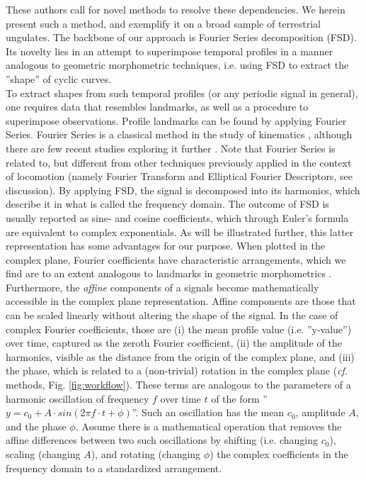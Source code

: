 These authors call for novel methods to resolve these dependencies.
We herein present such a method, and exemplify it on a broad sample of terrestrial ungulates.
The backbone of our approach is Fourier Series decomposition (FSD).
Its novelty lies in an attempt to superimpose temporal profiles in a manner analogous to geometric morphometric techniques, i.e. using FSD to extract the ''shape'' of cyclic curves.
\\To extract shapes from such temporal profiles (or any periodic signal in general), one requires data that resembles landmarks, as well as a procedure to superimpose observations.
Profile landmarks can be found by applying Fourier Series.
Fourier Series is a classical method in the study of kinematics \citep{Bernstein1927a,Bernstein1935}, although there are few recent studies exploring it further \citep{vanWeeren1992,Grasso2000,Webb2007}.
Note that Fourier Series is related to, but different from other techniques previously applied in the context of locomotion (namely Fourier Transform and Elliptical Fourier Descriptors, see discussion).
By applying FSD, the signal is decomposed into its harmonics, which describe it in what is called the frequency domain.
The outcome of FSD is usually reported as sine- and cosine coefficients, which through Euler's formula are equivalent to complex exponentials.
As will be illustrated further, this latter representation has some advantages for our purpose.
When plotted in the complex plane, Fourier coefficients have characteristic arrangements, which we find are to an extent analogous to landmarks in geometric morphometrics \citep{Bookstein1991,Kendall1989}.
Furthermore, the \textit{affine} components of a signals become mathematically accessible in the complex plane representation.
Affine components are those that can be scaled linearly without altering the shape of the signal.
In the case of complex Fourier coefficients, those are (i) the mean profile value (i.e. ''y-value'') over time, captured as the zeroth Fourier coefficient, (ii) the amplitude of the harmonics, visible as the distance from the origin of the complex plane, and (iii) the phase, which is related to a (non-trivial) rotation in the complex plane (\textit{cf.} methods, Fig. \ref{fig:workflow}).
These terms are analogous to the parameters of a harmonic oscillation of frequency $f$ over time $t$ of the form ''$y = c_0 + A\cdot sin(2\pi f\cdot t + \phi)$''.
Such an oscillation has the mean $c_0$, amplitude $A$, and the phase $\phi$.
Assume there is a mathematical operation that removes the affine differences between two such oscillations by shifting (i.e. changing $c_0$), scaling (changing $A$), and rotating (changing $\phi$) the complex coefficients in the frequency domain to a standardized arrangement.
